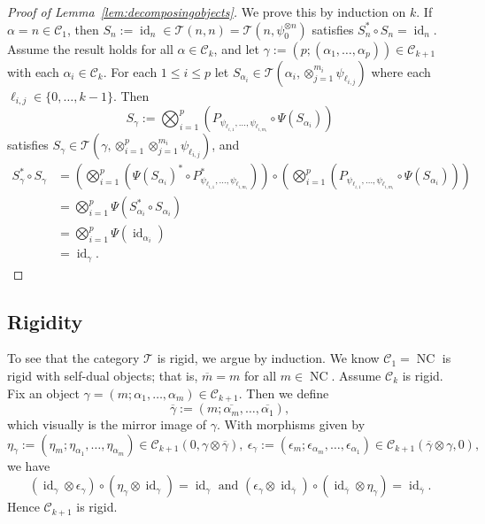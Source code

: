 \documentclass[12pt, a4paper]{amsart}
\def\id{\operatorname{id}}
\def\NC{\operatorname{NC}}
\def\CC{\mathcal{C}}
\def\TT{\mathcal{T}}
\theoremstyle{definition}
\theoremstyle{remark}
\numberwithin{equation}{section}
\begin{document}
\begin{proof}[Proof of Lemma~\ref{lem:decomposingobjects}]
	We prove this by induction on $k$. If $\alpha=n\in\mathcal{C}_1$, then $S_n:=\id_n\in\mathcal{T}(n,n)=\mathcal{T}(n,\psi_0^{\otimes n})$ satisfies $S_n^*\circ S_n=\id_n$. Assume the result holds for all $\alpha\in\mathcal{C}_k$, and let $\gamma:=(p;(\alpha_1,\dots,\alpha_p))\in\mathcal{C}_{k+1}$ with each $\alpha_i\in\mathcal{C}_k$. For each $1\le i\le p$ let $S_{\alpha_i}\in \mathcal{T}(\alpha_i,\otimes_{j=1}^{m_i}\psi_{\ell_{i,j}})$ where each $\ell_{i,j}\in\{0,\dots,k-1\}$. Then 
	\[
	S_\gamma:=\bigotimes_{i=1}^p\left(P_{\psi_{\ell_{i,1}},\dots,\psi_{\ell_{i,m_i}}}\circ\Psi(S_{\alpha_i})\right)
	\]
	satisfies $S_\gamma\in\TT(\gamma,\otimes_{i=1}^p\otimes_{j=1}^{m_i}\psi_{\ell_{i,j}})$, and 
	\begin{align*}
	S_{\gamma}^*\circ S_\gamma&=\left(\bigotimes_{i=1}^p\left(\Psi(S_{\alpha_i})^*\circ P_{\psi_{\ell_{i,1}},\dots,\psi_{\ell_{i,m_i}}}^*\right)\right)\circ \left(\bigotimes_{i=1}^p\left(P_{\psi_{\ell_{i,1}},\dots,\psi_{\ell_{i,m_i}}}\circ\Psi(S_{\alpha_i})\right)\right) \\
	&= \bigotimes_{i=1}^p\Psi(S_{\alpha_i}^*\circ S_{\alpha_i})\\
	&= \bigotimes_{i=1}^p \Psi(\id_{\alpha_i})\\
	&= \id_\gamma.
	\end{align*}
\end{proof}

\subsection{Rigidity} To see that the category $\TT$ is rigid, we argue by induction. We know $\CC_1 = \NC$ is rigid with self-dual objects; that is, $\overline{m}=m$ for all $m\in\NC$. Assume $\CC_k$ is rigid. Fix an object $\gamma = (m;\alpha_1,\dots,\alpha_m) \in \CC_{k+1}$. Then we define
\[
 \overline{\gamma} := (m;\overline{\alpha_m},\dots,\overline{\alpha_1}),
\]
which visually is the mirror image of $\gamma$. With morphisms given by
\[
 \eta_\gamma := (\eta_m;\eta_{\alpha_1},\dots,\eta_{\alpha_m}) \in \CC_{k+1}(0,\gamma\otimes\overline{\gamma}), \ \epsilon_\gamma := (\epsilon_m;\epsilon_{\alpha_m},\dots,\epsilon_{\alpha_1}) \in \CC_{k+1}(\overline{\gamma}\otimes\gamma,0),
\]
we have 
\[
(\id_\gamma\otimes\epsilon_\gamma)\circ (\eta_\gamma\otimes\id_\gamma)=\id_\gamma\text{ and }(\epsilon_\gamma\otimes\id_{\overline{\gamma}})\circ(\id_{\overline{\gamma}}\otimes \eta_\gamma)=\id_{\overline{\gamma}}.
\]
Hence $\CC_{k+1}$ is rigid. 
\end{document}
